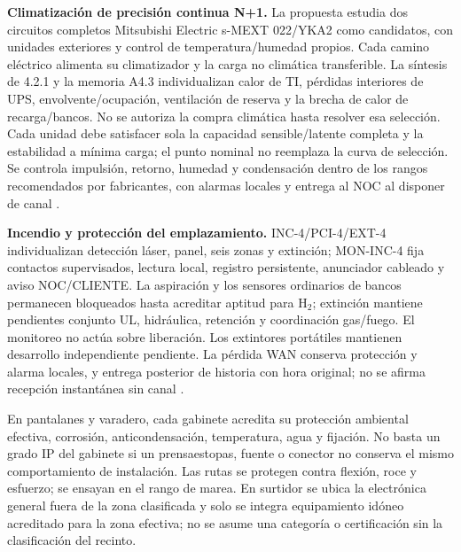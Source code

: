 \textbf{Climatización de precisión continua N+1.} La propuesta estudia dos circuitos completos Mitsubishi Electric s-MEXT 022/YKA2 como candidatos, con unidades exteriores y control de temperatura/humedad propios. Cada camino eléctrico alimenta su climatizador y la carga no climática transferible. La síntesis de 4.2.1 y la memoria A4.3 individualizan calor de TI, pérdidas interiores de UPS, envolvente/ocupación, ventilación de reserva y la brecha de calor de recarga/bancos. No se autoriza la compra climática hasta resolver esa selección. Cada unidad debe satisfacer sola la capacidad sensible/latente completa y la estabilidad a mínima carga; el punto nominal no reemplaza la curva de selección. Se controla impulsión, retorno, humedad y condensación dentro de los rangos recomendados por fabricantes, con alarmas locales y entrega al NOC al disponer de canal \parencites[RT-06.13/14, p.~15]{pucv-transversal}{p6-mext-pi-2025}{p6-mext-control-me38}.

\textbf{Incendio y protección del emplazamiento.} INC-4/PCI-4/EXT-4 individualizan detección láser, panel, seis zonas y extinción; MON-INC-4 fija contactos supervisados, lectura local, registro persistente, anunciador cableado y aviso NOC/CLIENTE. La aspiración y los sensores ordinarios de bancos permanecen bloqueados hasta acreditar aptitud para H$_2$; extinción mantiene pendientes conjunto UL, hidráulica, retención y coordinación gas/fuego. El monitoreo no actúa sobre liberación. Los extintores portátiles mantienen desarrollo independiente pendiente. La pérdida WAN conserva protección y alarma locales, y entrega posterior de historia con hora original; no se afirma recepción instantánea sin canal \parencite[RT-06.16--19]{pucv-transversal}.

En pantalanes y varadero, cada gabinete acredita su protección ambiental efectiva, corrosión, anticondensación, temperatura, agua y fijación. No basta un grado IP del gabinete si un prensaestopas, fuente o conector no conserva el mismo comportamiento de instalación. Las rutas se protegen contra flexión, roce y esfuerzo; se ensayan en el rango de marea. En surtidor se ubica la electrónica general fuera de la zona clasificada y solo se integra equipamiento idóneo acreditado para la zona efectiva; no se asume una categoría o certificación sin la clasificación del recinto.

